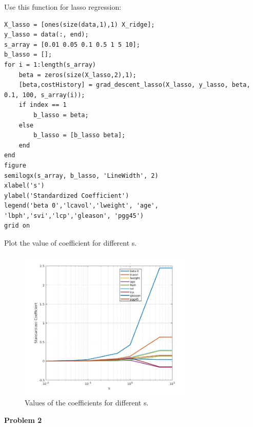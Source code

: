 \documentclass[12pt]{article}
\begin{document}
\begin{enumerate}[label=\alph*)]
Use this function for lasso regression:

\begin{lstlisting}
X_lasso = [ones(size(data,1),1) X_ridge];
y_lasso = data(:, end);
s_array = [0.01 0.05 0.1 0.5 1 5 10];
b_lasso = [];
for i = 1:length(s_array)
    beta = zeros(size(X_lasso,2),1);
    [beta,costHistory] = grad_descent_lasso(X_lasso, y_lasso, beta, 0.1, 100, s_array(i));
    if index == 1
        b_lasso = beta;
    else
        b_lasso = [b_lasso beta];
    end   
end
figure
semilogx(s_array, b_lasso, 'LineWidth', 2)
xlabel('s')
ylabel('Standardized Coefficient')
legend('beta 0','lcavol','lweight', 'age', 'lbph','svi','lcp','gleason', 'pgg45')
grid on
\end{lstlisting}

Plot the value of coefficient for different s.

    \begin{figure}[H]
\begin{center}
  \caption{Values of the coefficients for different s.}
  \includegraphics[width=0.75\textwidth]{images/Fig3.jpg}
 \end{center}
\end{figure}

\end{enumerate}
\textbf{Problem 2}
\end{document}
